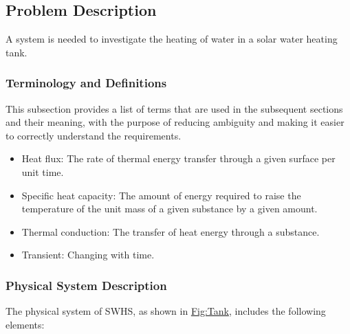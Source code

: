 \documentclass[12pt]{article}
\begin{document}
\subsection{Problem Description}
\label{Sec:ProbDesc}
A system is needed to investigate the heating of water in a solar water heating tank.

\subsubsection{Terminology and Definitions}
\label{Sec:TermDefs}
This subsection provides a list of terms that are used in the subsequent sections and their meaning, with the purpose of reducing ambiguity and making it easier to correctly understand the requirements.

\begin{itemize}
\item{Heat flux: The rate of thermal energy transfer through a given surface per unit time.}
\item{Specific heat capacity: The amount of energy required to raise the temperature of the unit mass of a given substance by a given amount.}
\item{Thermal conduction: The transfer of heat energy through a substance.}
\item{Transient: Changing with time.}
\end{itemize}
\subsubsection{Physical System Description}
\label{Sec:PhysSyst}
The physical system of SWHS, as shown in \hyperref[Figure:Tank]{Fig:Tank}, includes the following elements:
\end{document}

